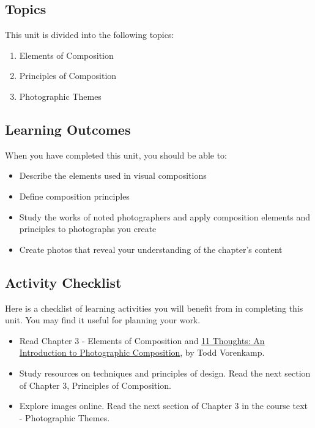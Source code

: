\documentclass[
]{book}
\providecommand{\tightlist}{%
  \setlength{\itemsep}{0pt}\setlength{\parskip}{0pt}}
\begin{document}
\hypertarget{topics-2}{%
\subsection{Topics}\label{topics-2}}

This unit is divided into the following topics:

\begin{enumerate}
\def\labelenumi{\arabic{enumi}.}
\tightlist
\item
  Elements of Composition\\
\item
  Principles of Composition\\
\item
  Photographic Themes
\end{enumerate}

\hypertarget{learning-outcomes-2}{%
\subsection*{Learning Outcomes}\label{learning-outcomes-2}}

When you have completed this unit, you should be able to:

\begin{itemize}
\tightlist
\item
  Describe the elements used in visual compositions\\
\item
  Define composition principles\\
\item
  Study the works of noted photographers and apply composition elements and principles to photographs you create\\
\item
  Create photos that reveal your understanding of the chapter's content
\end{itemize}

\hypertarget{activity-checklist-2}{%
\subsection*{Activity Checklist}\label{activity-checklist-2}}

Here is a checklist of learning activities you will benefit from in completing this unit. You may find it useful for planning your work.

\begin{itemize}
\item
  Read Chapter 3 - Elements of Composition and \href{https://www.bhphotovideo.com/explora/photography/tips-and-solutions/11-thoughts-introduction-photographic-composition}{11 Thoughts: An Introduction to Photographic Composition}, by Todd Vorenkamp.
\item
  Study resources on techniques and principles of design. Read the next section of Chapter 3, Principles of Composition.
\item
  Explore images online. Read the next section of Chapter 3 in the course text - Photographic Themes.
\end{itemize}
\end{document}
